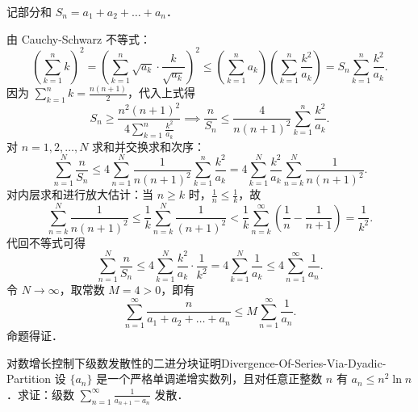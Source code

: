 \begin{myproof}
    记部分和 $S_n = a_1 + a_2 + \dots + a_n$．

    由 Cauchy-Schwarz 不等式：
    \begin{equation}
        \left( \sum_{k=1}^n k \right)^2 = \left( \sum_{k=1}^n \sqrt{a_k} \cdot \frac{k}{\sqrt{a_k}} \right)^2 \leqslant \left( \sum_{k=1}^n a_k \right) \left( \sum_{k=1}^n \frac{k^2}{a_k} \right) = S_n \sum_{k=1}^n \frac{k^2}{a_k}.
    \end{equation}
    因为 $\sum_{k=1}^n k = \frac{n(n+1)}{2}$，代入上式得
    \begin{equation}
        S_n \geqslant \frac{n^2(n+1)^2}{4 \sum_{k=1}^n \frac{k^2}{a_k}} \implies \frac{n}{S_n} \leqslant \frac{4}{n(n+1)^2} \sum_{k=1}^n \frac{k^2}{a_k}.
    \end{equation}
    对 $n = 1, 2, \dots, N$ 求和并交换求和次序：
    \begin{equation}
        \sum_{n=1}^N \frac{n}{S_n} \leqslant 4 \sum_{n=1}^N \frac{1}{n(n+1)^2} \sum_{k=1}^n \frac{k^2}{a_k} = 4 \sum_{k=1}^N \frac{k^2}{a_k} \sum_{n=k}^N \frac{1}{n(n+1)^2}.
    \end{equation}
    对内层求和进行放大估计：当 $n \geqslant k$ 时，$\frac{1}{n} \leqslant \frac{1}{k}$，故
    \begin{equation}
        \sum_{n=k}^N \frac{1}{n(n+1)^2} \leqslant \frac{1}{k} \sum_{n=k}^N \frac{1}{(n+1)^2} < \frac{1}{k} \sum_{n=k}^\infty \left( \frac{1}{n} - \frac{1}{n+1} \right) = \frac{1}{k^2}.
    \end{equation}
    代回不等式可得
    \begin{equation}
        \sum_{n=1}^N \frac{n}{S_n} \leqslant 4 \sum_{k=1}^N \frac{k^2}{a_k} \cdot \frac{1}{k^2} = 4 \sum_{k=1}^N \frac{1}{a_k} \leqslant 4 \sum_{n=1}^\infty \frac{1}{a_n}.
    \end{equation}
    令 $N \to \infty$，取常数 $M = 4 > 0$，即有
    \begin{equation}
        \sum_{n=1}^\infty \frac{n}{a_1 + a_2 + \dots + a_n} \leqslant M \sum_{n=1}^\infty \frac{1}{a_n}.
    \end{equation}
    命题得证．
\end{myproof}

\begin{problem}{对数增长控制下级数发散性的二进分块证明}{Divergence-Of-Series-Via-Dyadic-Partition}
    设 $\{a_n\}$ 是一个严格单调递增实数列，且对任意正整数 $n$ 有 $a_n \leqslant n^2 \ln n$．求证：级数 $\sum_{n=1}^\infty \frac{1}{a_{n+1} - a_n}$ 发散．
\end{problem}

